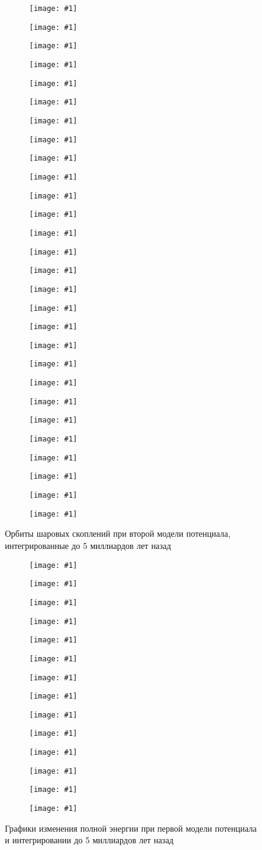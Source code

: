\documentclass[a4paper, oneside]{article}
\newlength{\imagewidth}
\newlength{\imageheight}
\newcommand{\subgraphics}[1]{
\settowidth{\imagewidth}{\texttt{[image: \#1]}}%
\begin{subfigure}{\imagewidth}%
    \texttt{[image: \#1]}%
\end{subfigure}%
}
\begin{document}
\newpage

\begin{figure}[H]
  \setlength{\imageheight}{2.85cm}
  \centering
  \subgraphics{orbits/M2/E 1/E 1 (Orbit, XY)}
  \subgraphics{orbits/M2/E 1/E 1 (Orbit, RZ)}
  \subgraphics{orbits/M2/FSR 1716/FSR 1716 (Orbit, XY)}
  \subgraphics{orbits/M2/FSR 1716/FSR 1716 (Orbit, RZ)}
  \subgraphics{orbits/M2/NGC 104/NGC 104 (Orbit, XY)}
  \subgraphics{orbits/M2/NGC 104/NGC 104 (Orbit, RZ)}
  \subgraphics{orbits/M2/NGC 1851/NGC 1851 (Orbit, XY)}
  \subgraphics{orbits/M2/NGC 1851/NGC 1851 (Orbit, RZ)}
  \subgraphics{orbits/M2/NGC 2419/NGC 2419 (Orbit, XY)}
  \subgraphics{orbits/M2/NGC 2419/NGC 2419 (Orbit, RZ)}
  \subgraphics{orbits/M2/NGC 5927/NGC 5927 (Orbit, XY)}
  \subgraphics{orbits/M2/NGC 5927/NGC 5927 (Orbit, RZ)}
  \subgraphics{orbits/M2/NGC 6284/NGC 6284 (Orbit, XY)}
  \subgraphics{orbits/M2/NGC 6284/NGC 6284 (Orbit, RZ)}
  \subgraphics{orbits/M2/NGC 7078/NGC 7078 (Orbit, XY)}
  \subgraphics{orbits/M2/NGC 7078/NGC 7078 (Orbit, RZ)}
  \subgraphics{orbits/M2/Pal 1/Pal 1 (Orbit, XY)}
  \subgraphics{orbits/M2/Pal 1/Pal 1 (Orbit, RZ)}
  \subgraphics{orbits/M2/Pal 3/Pal 3 (Orbit, XY)}
  \subgraphics{orbits/M2/Pal 3/Pal 3 (Orbit, RZ)}
  \subgraphics{orbits/M2/Pal 4/Pal 4 (Orbit, XY)}
  \subgraphics{orbits/M2/Pal 4/Pal 4 (Orbit, RZ)}
  \subgraphics{orbits/M2/Pal 7/Pal 7 (Orbit, XY)}
  \subgraphics{orbits/M2/Pal 7/Pal 7 (Orbit, RZ)}
  \subgraphics{orbits/M2/Pyxis/Pyxis (Orbit, XY)}
  \subgraphics{orbits/M2/Pyxis/Pyxis (Orbit, RZ)}
  \subgraphics{orbits/M2/Whiting 1/Whiting 1 (Orbit, XY)}
  \subgraphics{orbits/M2/Whiting 1/Whiting 1 (Orbit, RZ)}
  \caption{Орбиты шаровых скоплений при второй модели потенциала, интегрированные до 5 миллиардов лет назад}
\end{figure}

\newpage

\begin{figure}[H]
  \setlength{\imageheight}{3.85cm}
  \centering
  \subgraphics{orbits/M1/E 1/E 1 (Total energy)}
  \subgraphics{orbits/M1/FSR 1716/FSR 1716 (Total energy)}
  \subgraphics{orbits/M1/NGC 104/NGC 104 (Total energy)}
  \subgraphics{orbits/M1/NGC 1851/NGC 1851 (Total energy)}
  \subgraphics{orbits/M1/NGC 2419/NGC 2419 (Total energy)}
  \subgraphics{orbits/M1/NGC 5927/NGC 5927 (Total energy)}
  \subgraphics{orbits/M1/NGC 6284/NGC 6284 (Total energy)}
  \subgraphics{orbits/M1/NGC 7078/NGC 7078 (Total energy)}
  \subgraphics{orbits/M1/Pal 1/Pal 1 (Total energy)}
  \subgraphics{orbits/M1/Pal 3/Pal 3 (Total energy)}
  \subgraphics{orbits/M1/Pal 4/Pal 4 (Total energy)}
  \subgraphics{orbits/M1/Pal 7/Pal 7 (Total energy)}
  \subgraphics{orbits/M1/Pyxis/Pyxis (Total energy)}
  \subgraphics{orbits/M1/Whiting 1/Whiting 1 (Total energy)}
  \caption{Графики изменения полной энергии при первой модели потенциала и интегрировании до 5 миллиардов лет назад}
\end{figure}
\end{document}
